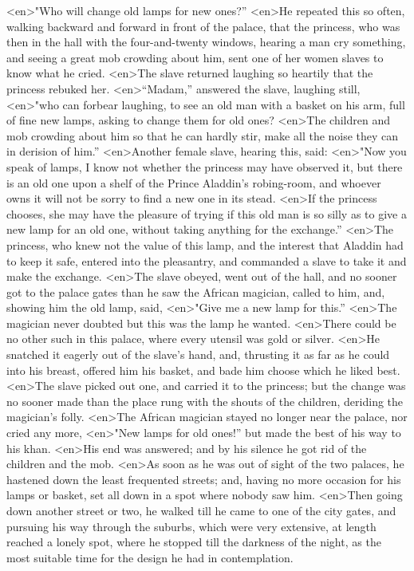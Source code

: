 <en>"Who will change old lamps for new ones?”
<en>He repeated this so often, walking backward and forward in front of the palace, that the princess, who was then in the hall with the four-and-twenty windows, hearing a man cry something, and seeing a great mob crowding about him, sent one of her women slaves to know what he cried.
<en>The slave returned laughing so heartily that the princess rebuked her.
<en>“Madam,” answered the slave, laughing still,
<en>"who can forbear laughing, to see an old man with a basket on his arm, full of fine new lamps, asking to change them for old ones?
<en>The children and mob crowding about him so that he can hardly stir, make all the noise they can in derision of him.”
<en>Another female slave, hearing this, said:
<en>"Now you speak of lamps, I know not whether the princess may have observed it, but there is an old one upon a shelf of the Prince Aladdin’s robing-room, and whoever owns it will not be sorry to find a new one in its stead.
<en>If the princess chooses, she may have the pleasure of trying if this old man is so silly as to give a new lamp for an old one, without taking anything for the exchange.”
<en>The princess, who knew not the value of this lamp, and the interest that Aladdin had to keep it safe, entered into the pleasantry, and commanded a slave to take it and make the exchange.
<en>The slave obeyed, went out of the hall, and no sooner got to the palace gates than he saw the African magician, called to him, and, showing him the old lamp, said,
<en>"Give me a new lamp for this.”
<en>The magician never doubted but this was the lamp he wanted.
<en>There could be no other such in this palace, where every utensil was gold or silver.
<en>He snatched it eagerly out of the slave’s hand, and, thrusting it as far as he could into his breast, offered him his basket, and bade him choose which he liked best.
<en>The slave picked out one, and carried it to the princess; but the change was no sooner made than the place rung with the shouts of the children, deriding the magician’s folly.
<en>The African magician stayed no longer near the palace, nor cried any more,
<en>"New lamps for old ones!” but made the best of his way to his khan.
<en>His end was answered; and by his silence he got rid of the children and the mob.
<en>As soon as he was out of sight of the two palaces, he hastened down the least frequented streets; and, having no more occasion for his lamps or basket, set all down in a spot where nobody saw him.
<en>Then going down another street or two, he walked till he came to one of the city gates, and pursuing his way through the suburbs, which were very extensive, at length reached a lonely spot, where he stopped till the darkness of the night, as the most suitable time for the design he had in contemplation.
